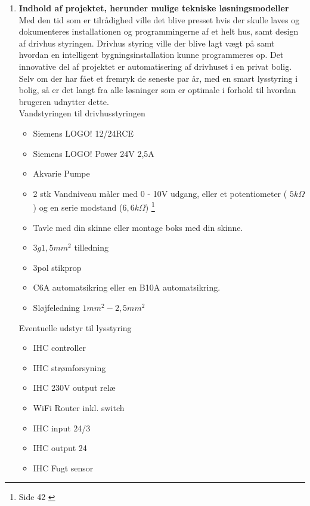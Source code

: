 \begin{enumerate}
    \item \textbf{Indhold af projektet, herunder mulige tekniske løsningsmodeller} \\ 
    Med den tid som er tilrådighed ville det blive presset hvis der skulle laves og dokumenteres installationen og programmingerne af et helt hus, samt design af drivhus styringen. 
    Drivhus styring ville der blive lagt vægt på samt hvordan en intelligent bygningsinstallation kunne programmeres op.
    Det innovative del af projektet er automatisering af drivhuset i en privat bolig. Selv om der har fået et fremryk de seneste par år, med en smart lysstyring i bolig, så er det langt fra alle løsninger som er optimale i forhold til hvordan brugeren udnytter dette. 
    \\
    Vandstyringen til drivhusstyringen
    \begin{itemize}
        \item Siemens LOGO! 12/24RCE
        \item Siemens LOGO! Power 24V 2,5A
        \item Akvarie Pumpe
        \item 2 stk Vandniveau måler med 0 - 10V udgang, eller et potentiometer ( $5k\Omega$) og en serie modstand ($6,6k\Omega$) \footnote{Side 42 \cite{logo_sm} }
        \item Tavle med din skinne eller montage boks med din skinne.
        \item $3g1,5mm^2$ tilledning
        \item 3pol stikprop
        \item C6A automatsikring eller en B10A automatsikring.
        \item Sløjfeledning $1mm^2 - 2,5mm^2$
    \end{itemize}
    Eventuelle udstyr til lysstyring
    \begin{itemize}
        \item IHC controller
        \item IHC strømforsyning
        \item IHC 230V output relæ
        \item WiFi Router inkl. switch
        \item IHC input 24/3
        \item IHC output 24
        \item IHC Fugt sensor
    \end{itemize}


\end{enumerate}
